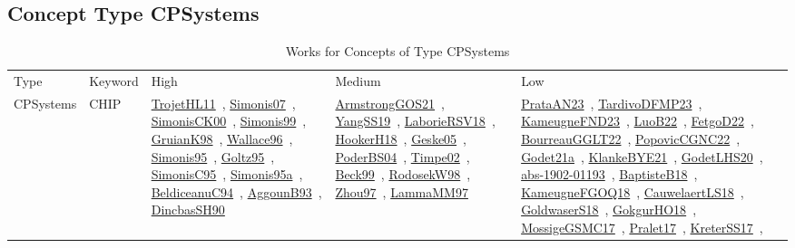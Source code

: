 \clearpage
\subsection{Concept Type CPSystems}
\label{sec:CPSystems}
{\scriptsize
\begin{longtable}{lp{3cm}>{\raggedright\arraybackslash}p{6cm}>{\raggedright\arraybackslash}p{6cm}>{\raggedright\arraybackslash}p{8cm}}
\rowcolor{white}\caption{Works for Concepts of Type CPSystems}\\ \toprule
\rowcolor{white}Type & Keyword & High & Medium & Low\\ \midrule\endhead
\bottomrule
\endfoot
CPSystems & CHIP & \href{works/TrojetHL11.pdf}{TrojetHL11}~\cite{TrojetHL11}, \href{works/Simonis07.pdf}{Simonis07}~\cite{Simonis07}, \href{works/SimonisCK00.pdf}{SimonisCK00}~\cite{SimonisCK00}, \href{works/Simonis99.pdf}{Simonis99}~\cite{Simonis99}, \href{works/GruianK98.pdf}{GruianK98}~\cite{GruianK98}, \href{works/Wallace96.pdf}{Wallace96}~\cite{Wallace96}, \href{works/Simonis95.pdf}{Simonis95}~\cite{Simonis95}, \href{works/Goltz95.pdf}{Goltz95}~\cite{Goltz95}, \href{works/SimonisC95.pdf}{SimonisC95}~\cite{SimonisC95}, \href{works/Simonis95a.pdf}{Simonis95a}~\cite{Simonis95a}, \href{works/BeldiceanuC94.pdf}{BeldiceanuC94}~\cite{BeldiceanuC94}, \href{works/AggounB93.pdf}{AggounB93}~\cite{AggounB93}, \href{works/DincbasSH90.pdf}{DincbasSH90}~\cite{DincbasSH90} & \href{works/ArmstrongGOS21.pdf}{ArmstrongGOS21}~\cite{ArmstrongGOS21}, \href{works/YangSS19.pdf}{YangSS19}~\cite{YangSS19}, \href{works/LaborieRSV18.pdf}{LaborieRSV18}~\cite{LaborieRSV18}, \href{works/HookerH18.pdf}{HookerH18}~\cite{HookerH18}, \href{works/Geske05.pdf}{Geske05}~\cite{Geske05}, \href{works/PoderBS04.pdf}{PoderBS04}~\cite{PoderBS04}, \href{works/Timpe02.pdf}{Timpe02}~\cite{Timpe02}, \href{works/Beck99.pdf}{Beck99}~\cite{Beck99}, \href{works/RodosekW98.pdf}{RodosekW98}~\cite{RodosekW98}, \href{works/Zhou97.pdf}{Zhou97}~\cite{Zhou97}, \href{works/LammaMM97.pdf}{LammaMM97}~\cite{LammaMM97} & \href{works/PrataAN23.pdf}{PrataAN23}~\cite{PrataAN23}, \href{works/TardivoDFMP23.pdf}{TardivoDFMP23}~\cite{TardivoDFMP23}, \href{works/KameugneFND23.pdf}{KameugneFND23}~\cite{KameugneFND23}, \href{works/LuoB22.pdf}{LuoB22}~\cite{LuoB22}, \href{works/FetgoD22.pdf}{FetgoD22}~\cite{FetgoD22}, \href{works/BourreauGGLT22.pdf}{BourreauGGLT22}~\cite{BourreauGGLT22}, \href{works/PopovicCGNC22.pdf}{PopovicCGNC22}~\cite{PopovicCGNC22}, \href{works/Godet21a.pdf}{Godet21a}~\cite{Godet21a}, \href{works/KlankeBYE21.pdf}{KlankeBYE21}~\cite{KlankeBYE21}, \href{works/GodetLHS20.pdf}{GodetLHS20}~\cite{GodetLHS20}, \href{works/abs-1902-01193.pdf}{abs-1902-01193}~\cite{abs-1902-01193}, \href{works/BaptisteB18.pdf}{BaptisteB18}~\cite{BaptisteB18}, \href{works/KameugneFGOQ18.pdf}{KameugneFGOQ18}~\cite{KameugneFGOQ18}, \href{works/CauwelaertLS18.pdf}{CauwelaertLS18}~\cite{CauwelaertLS18}, \href{works/GoldwaserS18.pdf}{GoldwaserS18}~\cite{GoldwaserS18}, \href{works/GokgurHO18.pdf}{GokgurHO18}~\cite{GokgurHO18}, \href{works/MossigeGSMC17.pdf}{MossigeGSMC17}~\cite{MossigeGSMC17}, \href{works/Pralet17.pdf}{Pralet17}~\cite{Pralet17}, \href{works/KreterSS17.pdf}{KreterSS17}~\cite{KreterSS17}, 
\end{longtable}}

